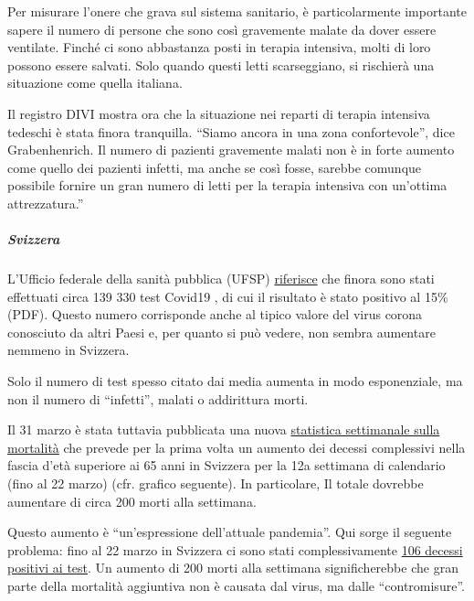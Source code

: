 Per misurare l'onere che grava sul sistema sanitario, è particolarmente
importante sapere il numero di persone che sono così gravemente malate
da dover essere ventilate. Finché ci sono abbastanza posti in terapia
intensiva, molti di loro possono essere salvati. Solo quando questi
letti scarseggiano, si rischierà una situazione come quella italiana.~

Il registro DIVI mostra ora che la situazione nei reparti di terapia
intensiva tedeschi è stata finora tranquilla. ``Siamo ancora in una zona
confortevole'', dice Grabenhenrich. Il numero di pazienti gravemente
malati non è in forte aumento come quello dei pazienti infetti, ma anche
se così fosse, sarebbe comunque possibile fornire un gran numero di
letti per la terapia intensiva con un'ottima attrezzatura.''

\hypertarget{svizzera}{%
\subparagraph{\texorpdfstring{\textbf{Svizzera}}{Svizzera}}\label{svizzera}}

L'Ufficio federale della sanità pubblica (UFSP)
\href{https://www.bag.admin.ch/bag/it/home/krankheiten/ausbrueche-epidemien-pandemien/aktuelle-ausbrueche-epidemien/novel-cov/situation-schweiz-und-international.html}{riferisce}
che finora sono stati effettuati circa 139 330 test Covid19 , di cui il
risultato è stato positivo al 15\% (PDF). Questo numero corrisponde
anche al tipico valore del virus corona conosciuto da altri Paesi e, per
quanto si può vedere, non sembra aumentare nemmeno in Svizzera.

Solo il numero di test spesso citato dai media aumenta in modo
esponenziale, ma non il numero di ``infetti'', malati o addirittura
morti.

Il 31 marzo è stata tuttavia pubblicata una nuova
\href{https://www.bfs.admin.ch/bfs/it/home/statistiche/salute/stato-salute/mortalita-cause-morte.html}{statistica
settimanale sulla mortalità} che prevede per la prima volta un aumento
dei decessi complessivi nella fascia d'età superiore ai 65 anni in
Svizzera per la 12a settimana di calendario (fino al 22 marzo) (cfr.
grafico seguente). In particolare, Il totale dovrebbe aumentare di circa
200 morti alla settimana.

Questo aumento è ``un'espressione dell'attuale pandemia''. Qui sorge il
seguente problema: fino al 22 marzo in Svizzera ci sono stati
complessivamente
\href{https://it.wikipedia.org/wiki/Pandemia_di_COVID-19_del_2020_in_Svizzera}{106
decessi positivi ai test}. Un aumento di 200 morti alla settimana
significherebbe che gran parte della mortalità aggiuntiva non è causata
dal virus, ma dalle ``contromisure''.

